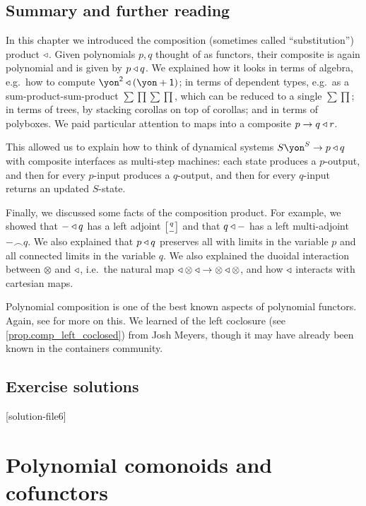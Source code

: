 \documentclass[Book-Poly]{subfiles}
\begin{document}
\section{Summary and further reading}

In this chapter we introduced the composition (sometimes called ``substitution'') product $\mathbin{\triangleleft}$. Given polynomials $p,q$ thought of as functors, their composite is again polynomial and is given by $p\mathbin{\triangleleft} q$. We explained how it looks in terms of algebra, e.g.\ how to compute $\yon^\2\tri(\yon+\1)$; in terms of dependent types, e.g.\ as a sum-product-sum-product $\sum\prod\sum\prod$, which can be reduced to a single $\sum\prod$; in terms of trees, by stacking corollas on top of corollas; and in terms of polyboxes. We paid particular attention to maps into a composite $p\to q\mathbin{\triangleleft} r$.

This allowed us to explain how to think of dynamical systems $S\yon^S\to p\tri q$ with composite interfaces as multi-step machines: each state produces a $p$-output, and then for every $p$-input produces a $q$-output, and then for every $q$-input returns an updated $S$-state. 

Finally, we discussed some facts of the composition product. For example, we showed that $-\mathbin{\triangleleft} q$ has a left adjoint $\lchom{q}{-}$ and that $q\mathbin{\triangleleft} -$ has a left multi-adjoint $-\frown q$. We also explained that $p\mathbin{\triangleleft} q$ preserves all with limits in the variable $p$ and all connected limits in the variable $q$. We also explained the duoidal interaction between $\otimes$ and $\mathbin{\triangleleft}$, i.e.\ the natural map $\mathbin{\triangleleft}\otimes\mathbin{\triangleleft}\to\otimes\mathbin{\triangleleft}\otimes$, and how $\mathbin{\triangleleft}$ interacts with cartesian maps.

Polynomial composition is one of the best known aspects of polynomial functors. Again, see \cite{kock2012polynomial} for more on this. We learned of the left coclosure (see \cref{prop.comp_left_coclosed}) from Josh Meyers, though it may have already been known in the containers community. 
\section{Exercise solutions}
{\footnotesize
}

[solution-file6]

\chapter{Polynomial comonoids and cofunctors}\label{ch.comon.sharp}
\end{document}
